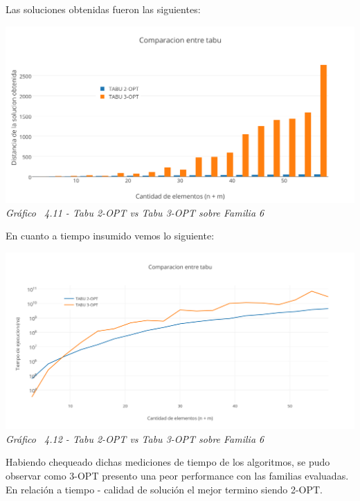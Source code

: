 Las soluciones obtenidas fueron las siguientes:

\vspace*{0.3cm} \vspace*{0.3cm}
  \begin{center}
 \includegraphics[scale=0.5]{./EJ4/comparativosinorden.png}\\
 {            \textit{Gráfico \ 4.11 - Tabu 2-OPT vs Tabu 3-OPT sobre Familia 6}}
  \end{center}
  \vspace*{0.3cm}

En cuanto a tiempo insumido vemos lo siguiente:

\vspace*{0.3cm} \vspace*{0.3cm}
  \begin{center}
 \includegraphics[scale=0.5]{./EJ4/comparacionsinorden1.png}\\
 {            \textit{Gráfico \ 4.12 - Tabu 2-OPT vs Tabu 3-OPT sobre Familia 6}}
  \end{center}
  \vspace*{0.3cm}

  

Habiendo chequeado dichas mediciones de tiempo de los algoritmos, se pudo observar como 3-OPT presento una peor performance con las familias evaluadas. En relaci\'on a tiempo - calidad de soluci\'on el mejor termino siendo 2-OPT.
